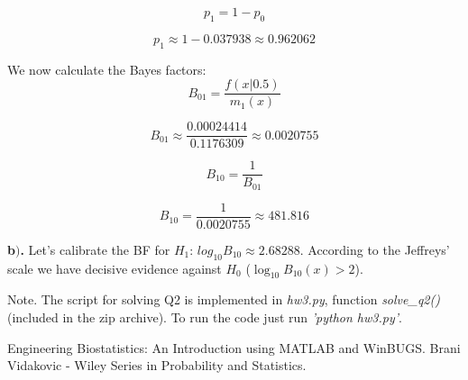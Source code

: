\documentclass[a4 paper]{article}
\begin{document}
$$
p_1 = 1 - p_0
$$

$$
p_1 \approx 1 - 0.037938 \approx 0.962062
$$


We now calculate the Bayes factors:
$$
B_{01}=\frac{f(x | 0.5)}{m_{1}(x)}
$$

$$
B_{01}\approx\frac{0.00024414}{0.1176309}\approx0.0020755
$$

$$
B_{10}=\frac{1}{B_{01}}
$$

$$
B_{10}=\frac{1}{0.0020755} \approx 481.816
$$



\textbf{b$)$.} Let's calibrate the BF for $H_1$: $log_{10}B_{10}\approx2.68288$.
According to the Jeffreys' scale 
we have decisive evidence against 
$H_0$ ($\log _{10} B_{10}(x)>2$). \newline

Note. The script for solving Q2 is implemented in 
\textit{hw3.py}, function \textit{solve\_q2()} 
(included in the zip archive). To run the code just run 
\textit{'python hw3.py'}. 





\begin{thebibliography}{9}


\label{stat} 
Engineering Biostatistics: An Introduction using MATLAB and WinBUGS. 
Brani Vidakovic - Wiley Series in Probability and Statistics.

\end{thebibliography}
\end{document}
